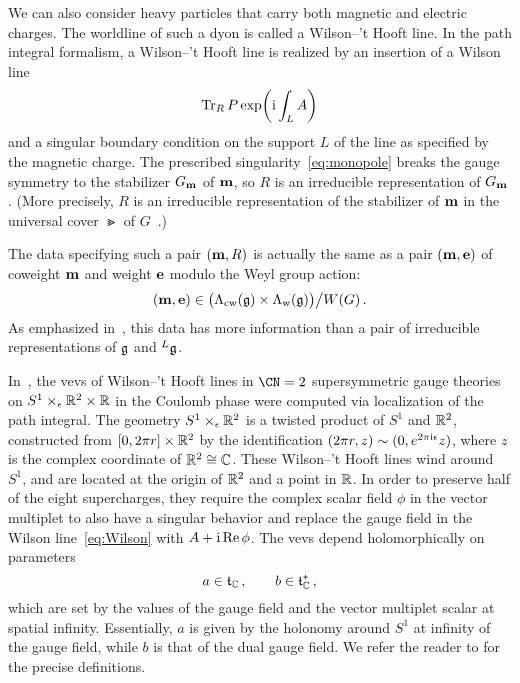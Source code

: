 We can also consider heavy particles that carry both magnetic and
electric charges.  The worldline of such a dyon is called a Wilson--'t
Hooft line.  In the path integral formalism, a Wilson--'t Hooft line
is realized by an insertion of a Wilson line
\begin{equation}
  \label{eq:Wilson}
  \mathop{\mathrm{Tr}}\nolimits_R P\exp\biggl(\mathrm{i}\int_L A\biggr)
\end{equation}
and a singular boundary condition on the support $L$ of the line as
specified by the magnetic charge.  The prescribed
singularity~\eqref{eq:monopole} breaks the gauge symmetry to the
stabilizer $G_{\mathbf{m}}$ of $\mathbf{m}$, so $R$ is an irreducible
representation of $G_{\mathbf{m}}$.  (More precisely, $R$ is an
irreducible representation of the stabilizer of $\mathbf{m}$ in the
universal cover $\Gt$ of $G$~\cite{Kapustin:2005py}.)

The data specifying such a pair $(\mathbf{m},R)$ is actually the same as
a pair $(\mathbf{m}, \mathbf{e})$ of coweight $\mathbf{m}$ and weight
$\mathbf{e}$ modulo the Weyl group action:
\begin{equation}
  (\mathbf{m}, \mathbf{e})
  \in
  \bigl(\Lambda_{\mathrm{cw}}(\mathfrak{g}) \times \Lambda_{\mathrm{w}}(\mathfrak{g})\bigr)\big/W(G) \,.
\end{equation}
As emphasized in~\cite{Kapustin:2005py}, this data has more information than
a pair of irreducible representations of $\mathfrak{g}$ and ${}^L\mathfrak{g}$.

In~\cite{Ito:2011ea}, the vevs of Wilson--'t Hooft lines in $\CN=2$
supersymmetric gauge theories on $S^1 \times_\epsilon \mathbb{R}^2 \times \mathbb{R}$ in
the Coulomb phase were computed via localization of the path integral.
The geometry $S^1 \times_\epsilon \mathbb{R}^2$ is a twisted product of $S^1$ and
$\mathbb{R}^2$, constructed from $[0,2\pi r] \times \mathbb{R}^2$ by the
identification $(2\pi r,z) \sim (0, e^{2\pi\mathrm{i}\epsilon} z)$, where $z$ is
the complex coordinate of $\mathbb{R}^2 \cong \mathbb{C}$.  These Wilson--'t Hooft
lines wind around $S^1$, and are located at the origin of $\mathbb{R}^2$ and a
point in $\mathbb{R}$.  In order to preserve half of the eight supercharges,
they require the complex scalar field $\phi$ in the vector multiplet
to also have a singular behavior and replace the gauge field in the
Wilson line~\eqref{eq:Wilson} with $A + \mathrm{i}\mathop{\mathrm{Re}}\nolimits\phi$.  The vevs depend
holomorphically on parameters
\begin{equation}
  a \in \mathfrak{t}_{\mathbb{C}} \,,
  \qquad
  b \in \mathfrak{t}^*_{\mathbb{C}} \,,
\end{equation}
which are set by the values of the gauge field and the vector
multiplet scalar at spatial infinity.  Essentially, $a$ is given by
the holonomy around $S^1$ at infinity of the gauge field, while $b$ is
that of the dual gauge field.  We refer the reader to
\cite{Ito:2011ea} for the precise definitions.


